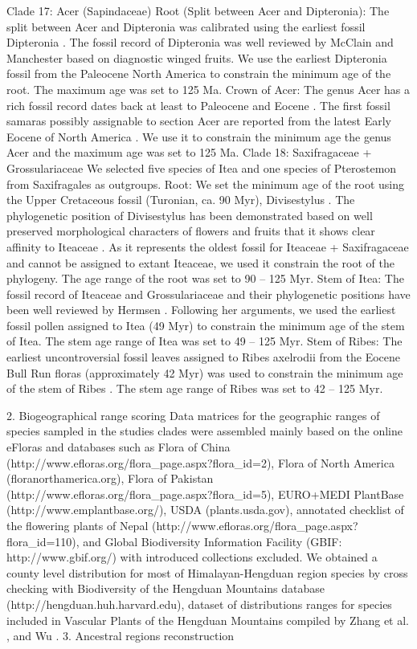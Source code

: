 \documentclass[10pt]{article}
\begin{document}
Clade 17: Acer (Sapindaceae)
Root (Split between Acer and Dipteronia):  The split between Acer and Dipteronia was calibrated using the earliest fossil Dipteronia \citep{McClain and Manchester 2001}. The fossil record of Dipteronia was well reviewed by McClain and Manchester \citep{McClain and Manchester 2001} based on diagnostic winged fruits. We use the earliest Dipteronia fossil from the Paleocene North America to constrain the minimum age of the root. The maximum age was set to 125 Ma.
Crown of Acer: The genus Acer has a rich fossil record dates back at least to Paleocene and Eocene \citep{Wolfe and Tanai 1987, Mai 1995}. The first fossil samaras possibly assignable to section Acer are reported from the latest Early Eocene of North America \citep{Wolfe and Tanai 1987}. We use it to constrain the minimum age the genus Acer and the maximum age was set to 125 Ma. 
Clade 18: Saxifragaceae + Grossulariaceae
We selected five species of Itea and one species of Pterostemon from Saxifragales as outgroups. 
Root: We set the minimum age of the root using the Upper Cretaceous fossil (Turonian, ca. 90 Myr), Divisestylus \citep{Hermsen, Gandolfo et al. 2003}. The phylogenetic position of Divisestylus has been demonstrated based on well preserved morphological characters of flowers and fruits that it shows clear affinity to Iteaceae \citep{Hermsen, Gandolfo et al. 2003}. As it represents the oldest fossil for Iteaceae + Saxifragaceae and cannot be assigned to extant Iteaceae, we used it constrain the root of the phylogeny. The age range of the root was set to 90 – 125 Myr.
Stem of Itea: The fossil record of Iteaceae and Grossulariaceae and their phylogenetic positions have been well reviewed by Hermsen \citep{Hermsen 2013}. Following her arguments, we used the earliest fossil pollen assigned to Itea (49 Myr) to constrain the minimum age of the stem of Itea. The stem age range of Itea was set to 49 – 125 Myr.
Stem of Ribes: The earliest uncontroversial fossil leaves assigned to Ribes axelrodii from the Eocene Bull Run floras (approximately 42 Myr) was used to constrain the minimum age of the stem of Ribes \citep{Hermsen 2005}. The stem age range of Ribes was set to 42 – 125 Myr.


2. Biogeographical range scoring
Data matrices for the geographic ranges of species sampled in the studies clades were assembled mainly based on the online eFloras and databases such as Flora of China (http://www.efloras.org/flora_page.aspx?flora_id=2), Flora of North America (floranorthamerica.org), Flora of Pakistan (http://www.efloras.org/flora_page.aspx?flora_id=5), EURO+MEDI PlantBase (http://www.emplantbase.org/), USDA (plants.usda.gov), annotated checklist of the flowering plants of Nepal (http://www.efloras.org/flora_page.aspx?flora_id=110), and Global Biodiversity Information Facility (GBIF: http://www.gbif.org/) with introduced collections excluded. We obtained a county level distribution for most of Himalayan-Hengduan region species by cross checking with Biodiversity of the Hengduan Mountains database (http://hengduan.huh.harvard.edu), dataset of distributions ranges for species included in Vascular Plants of the Hengduan Mountains compiled by Zhang et al. \citep{Zhang, Boufford et al. 2009}, and Wu \citep{Wu 2008}.
3. Ancestral regions reconstruction
\end{document}
